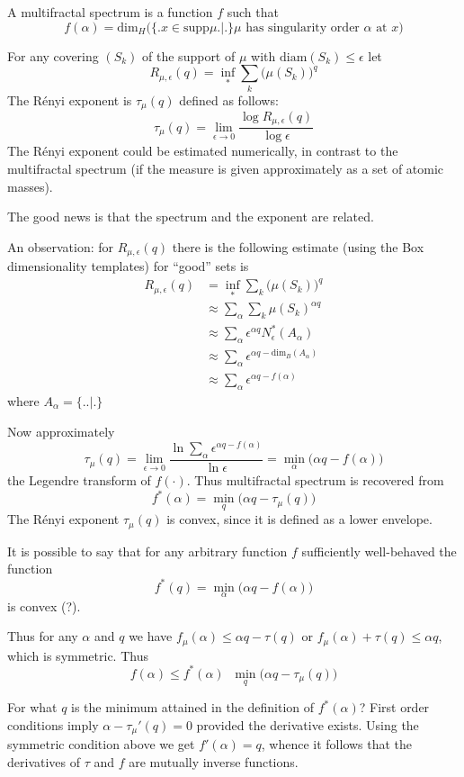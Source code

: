 \documentclass[a4paper]{article}
\newcommand{\defn}{\mathop{\overset{\Delta}{=}}\nolimits}
\begin{document}
A multifractal spectrum is a function $f$ such that 
\[f(\alpha) = \text{dim}_H\Big(\big\{\big. x\in \text{supp}\mu\big.\big\rvert \big.\big\} \mu \text{ has singularity order } \alpha \text{ at } x\Big)\]

For any covering $(S_k)$ of the support of $\mu$ with $\text{diam}(S_k)\leq \epsilon$ let
\[R_{\mu,\epsilon}(q) = \inf_* \sum_k \big(\mu(S_k)\big)^q\]
The R\'enyi exponent is $\tau_\mu(q)$ defined as follows:
\[\tau_\mu(q) = \lim_{\epsilon\to 0} \frac{\log R_{\mu,\epsilon}(q) }{\log \epsilon}\]
The R\'enyi exponent could be estimated numerically, in contrast to the multifractal spectrum (if the measure is given approximately as a set of atomic masses).

The good news is that the spectrum and the exponent are related.

An observation: for $R_{\mu,\epsilon}(q)$ there is the following estimate (using the Box dimensionality templates) for ``good'' sets is
\begin{align*}
	R_{\mu,\epsilon}(q)
	&= \inf_* \sum_k \big(\mu(S_k)\big)^q \\
	&\approx \sum_\alpha \sum_k \mu(S_k)^{\alpha q} \\
	&\approx \sum_\alpha \epsilon^{\alpha q} N^*_\epsilon(A_\alpha) \\
	&\approx \sum_\alpha \epsilon^{\alpha q - \text{dim}_B(A_\alpha)}\\
	&\approx \sum_\alpha \epsilon^{\alpha q - f(\alpha)}
\end{align*}
where $A_\alpha = \Big\{\Big. \Big.\Big\rvert \Big.\Big\}$

Now approximately
\[\tau_\mu(q) = \lim_{\epsilon\to0} \frac{\ln \sum_\alpha \epsilon^{\alpha q - f(\alpha)}}{\ln \epsilon} = \min_\alpha \big( \alpha q - f(\alpha) \big)\]
the Legendre transform of $f(\cdot)$. Thus multifractal spectrum is recovered from
\[f^*(\alpha) = \min_q \Big( \alpha q - \tau_\mu(q) \Big)\]
The R\'enyi exponent $\tau_\mu(q)$ is convex, since it is defined as a lower envelope.

It is possible to say that for any arbitrary function $f$ sufficiently well-behaved the function
\[f^*(q) = \min_\alpha\big(\alpha q - f(\alpha)\big)\]
is convex (?).

Thus for any $\alpha$ and $q$ we have $f_\mu(\alpha)\leq \alpha q - \tau(q)$ or $f_\mu(\alpha) + \tau(q)\leq \alpha q$, which is symmetric. Thus
\[f(\alpha)\leq f^*(\alpha) \defn \min_q \Big( \alpha q - \tau_\mu(q) \Big)\]

For what $q$ is the minimum attained in the definition of $f^*(\alpha)$? First order conditions imply $\alpha - \tau_\mu'(q) = 0$ provided the derivative exists. Using the symmetric condition above we get $f'(\alpha) = q$, whence it follows that the derivatives of $\tau$ and $f$ are mutually inverse functions.
\end{document}
